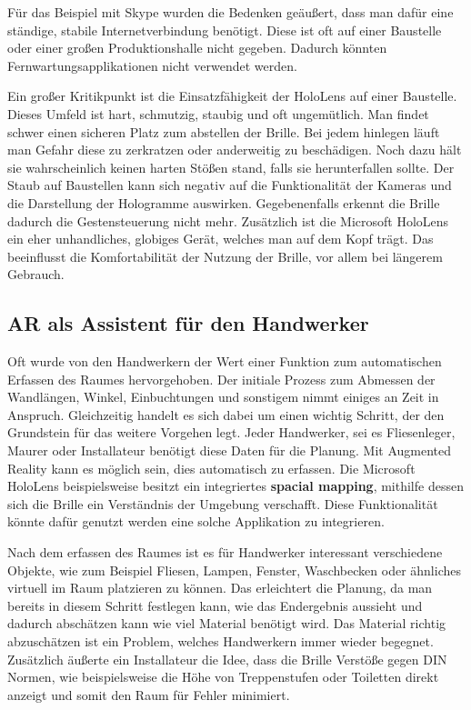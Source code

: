 Für das Beispiel mit Skype wurden die Bedenken geäußert, dass man dafür eine ständige, stabile Internetverbindung benötigt. Diese ist oft auf einer Baustelle oder einer großen Produktionshalle nicht gegeben. Dadurch könnten Fernwartungsapplikationen nicht verwendet werden.

Ein großer Kritikpunkt ist die Einsatzfähigkeit der HoloLens auf einer Baustelle. Dieses Umfeld ist hart, schmutzig, staubig und oft ungemütlich. Man findet schwer einen sicheren Platz zum abstellen der Brille. Bei jedem hinlegen läuft man Gefahr diese zu zerkratzen oder anderweitig zu beschädigen. Noch dazu hält sie wahrscheinlich keinen harten Stößen stand, falls sie herunterfallen sollte. Der Staub auf Baustellen kann sich negativ auf die Funktionalität der Kameras und die Darstellung der Hologramme auswirken. Gegebenenfalls erkennt die Brille dadurch die Gestensteuerung nicht mehr. Zusätzlich ist die Microsoft HoloLens ein eher unhandliches, globiges Gerät, welches man auf dem Kopf trägt. Das beeinflusst die Komfortabilität der Nutzung der Brille, vor allem bei längerem Gebrauch.

\subsection{AR als Assistent für den Handwerker}

Oft wurde von den Handwerkern der Wert einer Funktion zum automatischen Erfassen des Raumes hervorgehoben. Der initiale Prozess zum Abmessen der Wandlängen, Winkel, Einbuchtungen und sonstigem nimmt einiges an Zeit in Anspruch. Gleichzeitig handelt es sich dabei um einen wichtig Schritt, der den Grundstein für das weitere Vorgehen legt. Jeder Handwerker, sei es Fliesenleger, Maurer oder Installateur benötigt diese Daten für die Planung. Mit Augmented Reality kann es möglich sein, dies automatisch zu erfassen. Die Microsoft HoloLens beispielsweise besitzt ein integriertes \textbf{spacial mapping}, mithilfe dessen sich die Brille ein Verständnis der Umgebung verschafft. Diese Funktionalität könnte dafür genutzt werden eine solche Applikation zu integrieren. 

Nach dem erfassen des Raumes ist es für Handwerker interessant verschiedene Objekte, wie zum Beispiel Fliesen, Lampen, Fenster, Waschbecken oder ähnliches virtuell im Raum platzieren zu können. Das erleichtert die Planung, da man bereits in diesem Schritt festlegen kann, wie das Endergebnis aussieht und dadurch abschätzen kann wie viel Material benötigt wird. Das Material richtig abzuschätzen ist ein Problem, welches Handwerkern immer wieder begegnet. Zusätzlich äußerte ein Installateur die Idee, dass die Brille Verstöße gegen DIN Normen, wie beispielsweise die Höhe von Treppenstufen oder Toiletten direkt anzeigt und somit den Raum für Fehler minimiert. 

